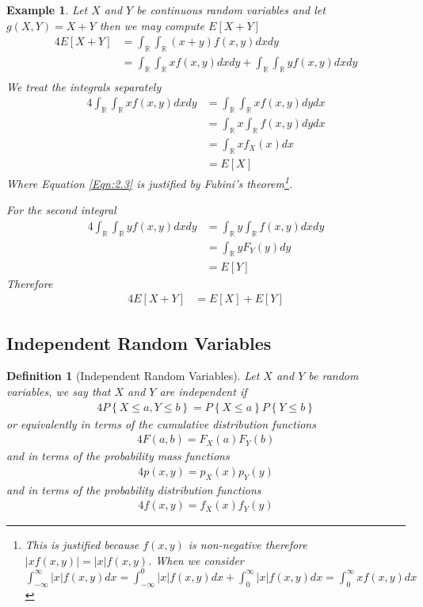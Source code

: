 \documentclass[11pt, oneside]{book}   	%
\newtheorem{definition}{Definition}[chapter]
\newtheorem{example}{Example}[chapter]
\newcommand{\set}[1]{\left\{#1\right\}}
\begin{document}
\begin{example}
	Let $X$ and $Y$ be continuous random variables and let $g(X, Y)=X+Y$ then we may compute $E[X+Y]$
	\begin{alignat}{4}
		E[X+Y]&=\int_\mathbb{R}\int_\mathbb{R} (x+y)f(x, y)dxdy \\
			&=\int_\mathbb{R}\int_\mathbb{R} xf(x, y)dx dy + \int_\mathbb{R}\int_\mathbb{R} yf(x, y)dx dy \\
	\end{alignat}
	We treat the integrals separately 
	\begin{alignat}{4}
		\int_\mathbb{R}\int_\mathbb{R} xf(x, y) dx dy &=\int_\mathbb{R}\int_\mathbb{R} x f(x, y) dy dx \label{Eqn:2.3} \\
			&=\int_\mathbb{R} x \int_\mathbb{R} f(x, y) dy dx \\
			&=\int_\mathbb{R} x f_X(x) dx \\
			&= E[X]
	\end{alignat}
	Where Equation \ref{Eqn:2.3} is justified by Fubini's theorem\footnote{This is justified because $f(x, y)$ is non-negative therefore $\left|x f(x, y)\right| = |x|f(x, y)$. When we consider $\int_{-\infty}^\infty |x|f(x, y)dx=\int_{-\infty}^0|x|f(x, y)dx + \int_0^\infty|x|f(x, y)dx=\int_0^\infty xf(x, y)dx$}. 
	
	For the second integral 
	\begin{alignat}{4}
		\int_\mathbb{R}\int_\mathbb{R} yf(x, y) dx dy &=\int_\mathbb{R} y \int_\mathbb{R} f(x, y) dx dy \\
			&= \int_\mathbb{R} y F_Y(y) dy \\
			&= E[Y]
	\end{alignat}
	Therefore
	\begin{alignat}{4}
		E[X+Y] &= E[X] + E[Y]
	\end{alignat}
	
\end{example}

\subsection{Independent Random Variables}

\begin{definition}[Independent Random Variables]
	Let $X$ and $Y$ be random variables, we say that $X$ and $Y$ are independent if 
	\begin{alignat}{4}
		P\set{X\leq a, Y\leq b}=P\set{X\leq a}P\set{Y\leq b}
	\end{alignat}
	or equivalently in terms of the cumulative distribution functions 
	\begin{alignat}{4}
		F(a, b)=F_X(a)F_Y(b)
	\end{alignat}
	and in terms of the probability mass functions 
	\begin{alignat}{4}
		p(x, y)=p_X(x)p_Y(y)
	\end{alignat}
	and in terms of the probability distribution functions 
	\begin{alignat}{4}
		f(x, y)=f_X(x)f_Y(y)
	\end{alignat}
\end{definition}
\end{document}
